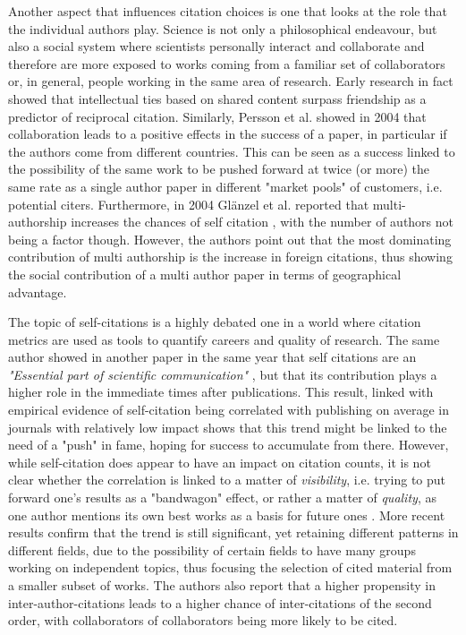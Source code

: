 Another aspect that influences citation choices is one that looks at the role that the individual authors play. Science is not only a philosophical endeavour, but also a social system where scientists personally interact
and collaborate and therefore are more exposed to works coming from a familiar set of collaborators or, in general, people working in the same area of research. Early research in fact showed that \cite{ASI:ASI10369} intellectual ties based on shared content surpass friendship as a predictor of reciprocal citation. Similarly, Persson et al. \cite{Persson2004} showed in 2004 that collaboration leads to a positive effects in the success of a paper, in particular if
the authors come from different countries.
This can be seen as a success linked to the possibility of the same work to be pushed forward at twice (or more) the same rate as a single author paper in different
"market pools" of customers, i.e. potential citers.  Furthermore, in 2004 Gl{\"a}nzel et al. reported that multi-authorship increases the chances of self citation \cite{Glanzel2004}, with the number of authors not being a factor though. However, the authors point out that
the most dominating contribution of multi authorship is the increase in foreign citations, thus showing the social contribution of a multi author paper in terms of geographical advantage. 

The topic of self-citations is
a highly debated one in a world where citation metrics are used as tools to quantify careers and quality of research. The same author showed in another paper in the same year that  self citations are an \textit{"Essential part
 of scientific communication"} \cite{Wolfgang2004}, but that its contribution plays a higher role in the immediate times after publications. This result, linked with empirical evidence of self-citation being correlated with publishing on average in journals with
relatively low impact shows that this trend might be linked to the need of a "push" in fame, hoping for success to accumulate from there. However, while self-citation does appear to have an impact on citation counts,
it is not clear whether the correlation is linked to a matter of \textit{visibility}, i.e. trying to put forward one's results as a "bandwagon" effect, or rather a matter of \textit{quality}, as one author
mentions its own best works as a basis for future ones \cite{Fowler2007}. More recent results confirm  \cite{10.1371/journal.pone.0033339} that the trend is still significant, yet retaining different patterns in different fields, due to the 
possibility of certain fields to have many groups working on independent topics, thus focusing the selection of cited material from a smaller subset of works. The authors also report that a higher propensity in inter-author-citations
leads to a higher chance of inter-citations of the second order, with collaborators of collaborators being more likely to be cited. 

